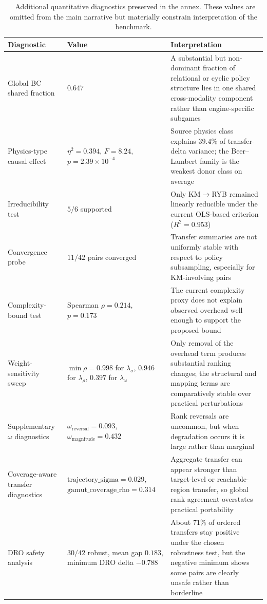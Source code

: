 \documentclass[twoside,twocolumn,9pt]{article}
\begin{document}
\begin{table}[!t]
\small
\caption{\ Additional quantitative diagnostics preserved in the annex. These values are omitted from the main narrative but materially constrain interpretation of the benchmark.}
\label{tab:extra_diagnostics}
\begin{tabular*}{\textwidth}{@{\extracolsep{\fill}}p{}p{}p{}}
\hline
\textbf{Diagnostic} & \textbf{Value} & \textbf{Interpretation}\\
\hline
Global BC shared fraction & $0.647$ & A substantial but non-dominant fraction of relational or cyclic policy structure lies in one shared cross-modality component rather than engine-specific subgames\\
Physics-type causal effect & $\eta^2=0.394$, $F=8.24$, $p=2.39\times 10^{-4}$ & Source physics class explains $39.4\%$ of transfer-delta variance; the Beer--Lambert family is the weakest donor class on average\\
Irreducibility test & $5/6$ supported & Only KM$\rightarrow$RYB remained linearly reducible under the current OLS-based criterion ($R^2=0.953$)\\
Convergence probe & $11/42$ pairs converged & Transfer summaries are not uniformly stable with respect to policy subsampling, especially for KM-involving pairs\\
Complexity-bound test & Spearman $\rho=0.214$, $p=0.173$ & The current complexity proxy does not explain observed overhead well enough to support the proposed bound\\
Weight-sensitivity sweep & $\min \rho=0.998$ for $\lambda_{\sigma}$, $0.946$ for $\lambda_{\rho}$, $0.397$ for $\lambda_{\omega}$ & Only removal of the overhead term produces substantial ranking changes; the structural and mapping terms are comparatively stable over practical perturbations\\
Supplementary $\omega$ diagnostics & $\omega_{\mathrm{reversal}}=0.093$, $\omega_{\mathrm{magnitude}}=0.432$ & Rank reversals are uncommon, but when degradation occurs it is large rather than marginal\\
Coverage-aware transfer diagnostics & $\mathrm{trajectory\_sigma}=0.029$, $\mathrm{gamut\_coverage\_rho}=0.314$ & Aggregate transfer can appear stronger than target-level or reachable-region transfer, so global rank agreement overstates practical portability\\
DRO safety analysis & $30/42$ robust, mean gap $0.183$, minimum DRO delta $-0.788$ & About $71\%$ of ordered transfers stay positive under the chosen robustness test, but the negative minimum shows some pairs are clearly unsafe rather than borderline\\
\hline
\end{tabular*}
\end{table}
\end{document}
